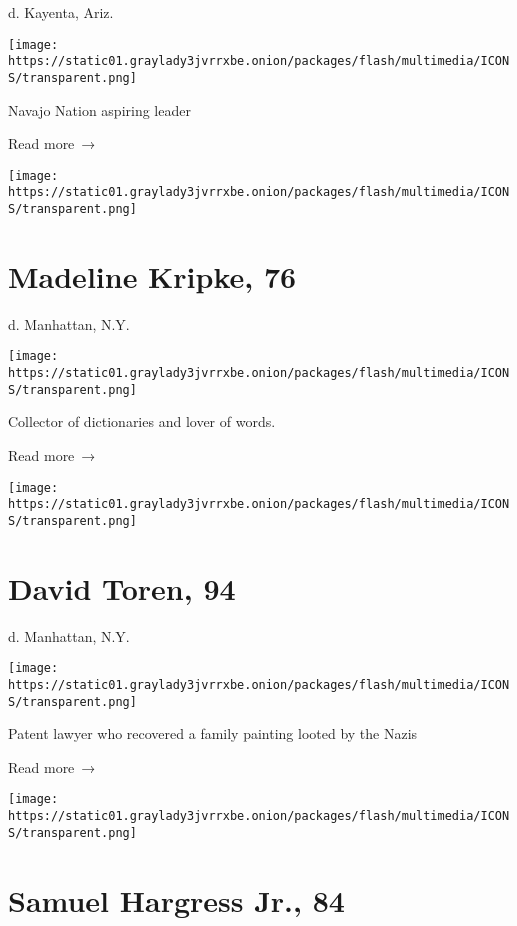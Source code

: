 d. Kayenta, Ariz.

\texttt{[image: https://static01.graylady3jvrrxbe.onion/packages/flash/multimedia/ICONS/transparent.png]}

Navajo Nation aspiring leader

 Read more~→

\href{https://www.nytimes3xbfgragh.onion/2020/04/30/nyregion/madeline-kripke-dead-coronavirus.html}{}

\texttt{[image: https://static01.graylady3jvrrxbe.onion/packages/flash/multimedia/ICONS/transparent.png]}

\hypertarget{madeline-kripke-76}{%
\section{Madeline Kripke, 76}\label{madeline-kripke-76}}

d. Manhattan, N.Y.

\texttt{[image: https://static01.graylady3jvrrxbe.onion/packages/flash/multimedia/ICONS/transparent.png]}

Collector of dictionaries and lover of words.

 Read more~→

\href{https://www.nytimes3xbfgragh.onion/2020/04/30/obituaries/david-toren-dead-coronavirus.html}{}

\texttt{[image: https://static01.graylady3jvrrxbe.onion/packages/flash/multimedia/ICONS/transparent.png]}

\hypertarget{david-toren-94}{%
\section{David Toren, 94}\label{david-toren-94}}

d. Manhattan, N.Y.

\texttt{[image: https://static01.graylady3jvrrxbe.onion/packages/flash/multimedia/ICONS/transparent.png]}

Patent lawyer who recovered a family painting looted by the Nazis

 Read more~→

\href{https://www.nytimes3xbfgragh.onion/2020/04/29/nyregion/samuel-hargress-jr-dead-coronavirus.html}{}

\texttt{[image: https://static01.graylady3jvrrxbe.onion/packages/flash/multimedia/ICONS/transparent.png]}

\hypertarget{samuel-hargress-jr-84}{%
\section{Samuel Hargress Jr., 84}\label{samuel-hargress-jr-84}}

